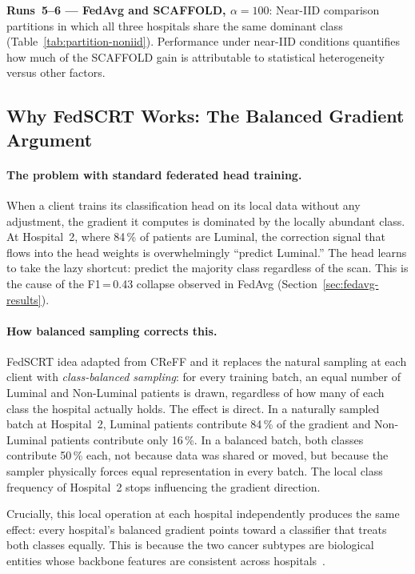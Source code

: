 \textbf{Runs~5--6 --- FedAvg and SCAFFOLD, $\alpha=100$}:
Near-IID comparison partitions in which all three
hospitals share the same dominant class
(Table~\ref{tab:partition-noniid}).
Performance under near-IID conditions quantifies
how much of the SCAFFOLD gain is attributable to
statistical heterogeneity versus other factors.


\subsection{Why FedSCRT Works: The Balanced Gradient Argument}
\label{sec:fedscrt-theory}

\paragraph{The problem with standard federated head training.}
When a client trains its classification head on its local
data without any adjustment, the gradient it computes is
dominated by the locally abundant class.
At Hospital~2, where 84\,\% of patients are Luminal,
the correction signal that flows into the head weights is
overwhelmingly ``predict Luminal.''
The head learns to take the lazy shortcut: predict the
majority class regardless of the scan.
This is the cause of the F1\,=\,0.43 collapse observed
in FedAvg (Section~\ref{sec:fedavg-results}).

\paragraph{How balanced sampling corrects this.}
FedSCRT idea adapted from CReFF \cite{Shang2022CReFF} and it replaces the natural sampling at each client                                                           
with \emph{class-balanced sampling}: for every training
batch, an equal number of Luminal and Non-Luminal patients
is drawn, regardless of how many of each class the hospital
actually holds.
The effect is direct.
In a naturally sampled batch at Hospital~2, Luminal
patients contribute 84\,\% of the gradient and Non-Luminal
patients contribute only 16\,\%.
In a balanced batch, both classes contribute 50\,\% each,
not because data was shared or moved, but because the
sampler physically forces equal representation in every
batch.
The local class frequency of Hospital~2 stops influencing
the gradient direction.

Crucially, this local operation at each hospital
independently produces the same effect: every hospital's
balanced gradient points toward a classifier that treats
both classes equally.
This is because the two cancer subtypes are biological
entities whose backbone features are consistent across
hospitals~\cite{Shang2022CReFF}.

